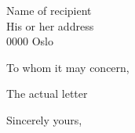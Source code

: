 \documentclass[UKenglish,iss]{xeuioletter}
\begin{document}
\begin{letter}{Name of recipient\\ His or her address\\ 0000 Oslo}
\opening{To whom it may concern,}
The actual letter
\closing{Sincerely yours,}
\end{letter}
\end{document}
